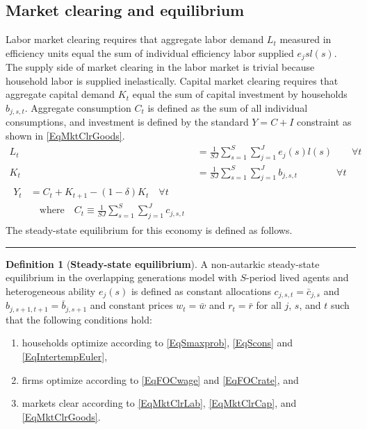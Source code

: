 \documentclass[letterpaper,12pt]{article}
\theoremstyle{definition}
\newtheorem{definition}{Definition} %
\begin{document}
\begin{spacing}{1.5}
  \subsection{Market clearing and equilibrium}\label{SecMCandEqlbm}

    Labor market clearing requires that aggregate labor demand $L_t$ measured in efficiency units equal the sum of individual efficiency labor supplied $e_j{s}l(s)$. The supply side of market clearing in the labor market is trivial because household labor is supplied inelastically. Capital market clearing requires that aggregate capital demand $K_t$ equal the sum of capital investment by households $b_{j,s,t}$. Aggregate consumption $C_t$ is defined as the sum of all individual consumptions, and investment is defined by the standard $Y = C + I$ constraint as shown in \eqref{EqMktClrGoods}.
    \begin{align}
      L_t &= \frac{1}{SJ}\sum_{s=1}^S\sum_{j=1}^{J} e_j(s)l(s) \quad\quad \forall t \label{EqMktClrLab} \\
      K_t &= \frac{1}{SJ}\sum_{s=1}^{S}\sum_{j=1}^{J}b_{j,s,t} \quad\quad\quad\quad \forall t \label{EqMktClrCap} \\
      \begin{split}
        Y_t &= C_t + K_{t+1} - (1-\delta)K_t \quad\forall t \\
        &\quad\text{where}\quad C_t \equiv \frac{1}{SJ}\sum_{s=1}^{S}\sum_{j=1}^{J}c_{j,s,t}
      \end{split} \label{EqMktClrGoods}
    \end{align}
    The steady-state equilibrium for this economy is defined as follows.

    \vspace{7mm}
    \end{spacing}
    \hrule
    \begin{definition}[\textbf{Steady-state equilibrium}]\label{DefEquilSS}
      A non-autarkic steady-state equilibrium in the overlapping generations model with $S$-period lived agents and heterogeneous ability $e_j(s)$ is defined as constant allocations $c_{j,s,t}=\bar{c}_{j,s}$ and $b_{j,s+1,t+1}=\bar{b}_{j,s+1}$ and constant prices $w_t=\bar{w}$ and $r_t=\bar{r}$ for all $j$, $s$, and $t$ such that the following conditions hold:
       \begin{enumerate}
          \item households optimize according to \eqref{EqSmaxprob}, \eqref{EqScons} and \eqref{EqIntertempEuler},
          \item firms optimize according to \eqref{EqFOCwage} and \eqref{EqFOCrate}, and
          \item markets clear according to \eqref{EqMktClrLab}, \eqref{EqMktClrCap}, and \eqref{EqMktClrGoods}.
       \end{enumerate}
    \end{definition}
\end{document}
